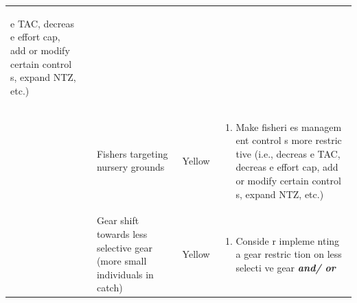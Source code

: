 \documentclass[]{book}
\providecommand{\tightlist}{%
  \setlength{\itemsep}{0pt}\setlength{\parskip}{0pt}}
\begin{document}
\begin{longtable}[]{@{}lllll@{}}
\begin{minipage}[t]{0.19\columnwidth}
\begin{enumerate}
  e TAC, decreas e effort cap, add or modify certain control s, expand
  NTZ, etc.)
\end{enumerate}\strut
\end{minipage}\tabularnewline
\begin{minipage}[t]{0.19\columnwidth}\raggedright\strut
\strut
\end{minipage} & \begin{minipage}[t]{0.19\columnwidth}\raggedright\strut
\strut
\end{minipage} & \begin{minipage}[t]{0.19\columnwidth}\raggedright\strut
Fishers targeting nursery grounds\strut
\end{minipage} & \begin{minipage}[t]{0.19\columnwidth}\raggedright\strut
Yellow\strut
\end{minipage} & \begin{minipage}[t]{0.19\columnwidth}\raggedright\strut
\begin{enumerate}
\def\labelenumi{\arabic{enumi}.}
\tightlist
\item
  Make fisheri es managem ent control s more restric tive (i.e., decreas
  e TAC, decreas e effort cap, add or modify certain control s, expand
  NTZ, etc.)
\end{enumerate}\strut
\end{minipage}\tabularnewline
\begin{minipage}[t]{0.19\columnwidth}\raggedright\strut
\strut
\end{minipage} & \begin{minipage}[t]{0.19\columnwidth}\raggedright\strut
\strut
\end{minipage} & \begin{minipage}[t]{0.19\columnwidth}\raggedright\strut
Gear shift towards less selective gear (more small individuals in
catch)\strut
\end{minipage} & \begin{minipage}[t]{0.19\columnwidth}\raggedright\strut
Yellow\strut
\end{minipage} & \begin{minipage}[t]{0.19\columnwidth}\raggedright\strut
\begin{enumerate}
\def\labelenumi{\arabic{enumi}.}
\tightlist
\item
  Conside r impleme nting a gear restric tion on less selecti ve gear
  \textbf{\emph{and/ or}}
\end{enumerate}


\end{minipage}
\end{longtable}
\end{document}
